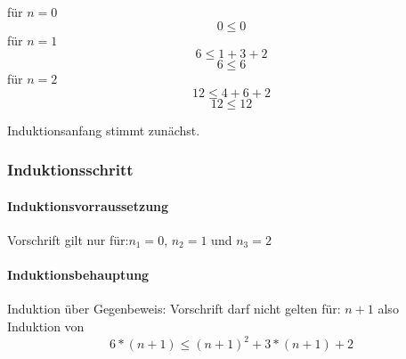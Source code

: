 \documentclass{article}
\begin{document}
für $n=0$
\[0 \le 0\]
für $n=1$
\[6 \le 1+3+2\]
\[ 6 \le 6 \]
\newline
für $n=2$
\[12 \le 4+6+2\]
\[ 12 \le 12 \]
\newline

Induktionsanfang stimmt zunächst.
\subsubsection{Induktionsschritt}
\paragraph{Induktionsvorraussetzung}\mbox{}

Vorschrift gilt nur für:$n_1=0$,  $n_2=1$ und  $n_3=2$

\paragraph{Induktionsbehauptung}\mbox{}
Induktion über Gegenbeweis:
Vorschrift darf nicht gelten für: $n+1$ also Induktion von \[6*(n+1) \le (n+1)^2+3*(n+1)+2\]
\section{}
\end{document}
